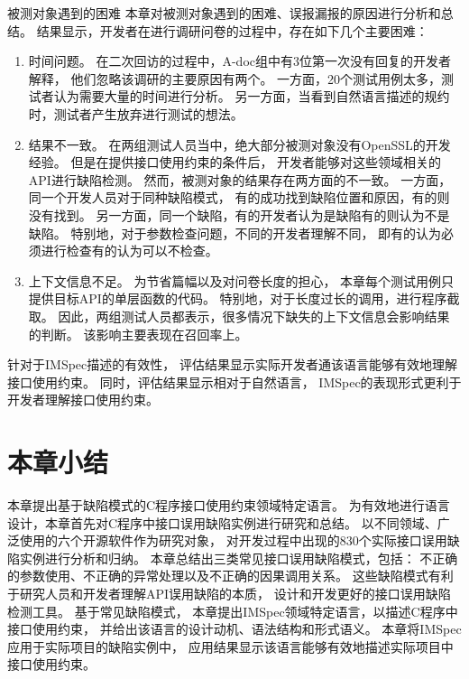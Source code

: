 {\kaishu 被测对象遇到的困难 }
本章对被测对象遇到的困难、误报漏报的原因进行分析和总结。
结果显示，开发者在进行调研问卷的过程中，存在如下几个主要困难：
\begin{enumerate}
	\item 时间问题。
	在二次回访的过程中，A-doc组中有3位第一次没有回复的开发者解释，
	他们忽略该调研的主要原因有两个。
	一方面，20个测试用例太多，测试者认为需要大量的时间进行分析。
	另一方面，当看到自然语言描述的规约时，测试者产生放弃进行测试的想法。
	\item 结果不一致。
	在两组测试人员当中，绝大部分被测对象没有OpenSSL的开发经验。
	但是在提供接口使用约束的条件后，
	开发者能够对这些领域相关的API进行缺陷检测。
	然而，被测对象的结果存在两方面的不一致。
	一方面，同一个开发人员对于同种缺陷模式，
	有的成功找到缺陷位置和原因，有的则没有找到。
	另一方面，同一个缺陷，有的开发者认为是缺陷有的则认为不是缺陷。
	特别地，对于参数检查问题，不同的开发者理解不同，
	即有的认为必须进行检查有的认为可以不检查。
	\item 上下文信息不足。
	为节省篇幅以及对问卷长度的担心，
	本章每个测试用例只提供目标API的单层函数的代码。
	特别地，对于长度过长的调用，进行程序截取。
	因此，两组测试人员都表示，很多情况下缺失的上下文信息会影响结果的判断。
	该影响主要表现在召回率上。
\end{enumerate}
	
针对于IMSpec描述的有效性，
评估结果显示实际开发者通该语言能够有效地理解接口使用约束。
同时，评估结果显示相对于自然语言，
IMSpec的表现形式更利于开发者理解接口使用约束。

\section{本章小结}
\label{sec:2.6}
本章提出基于缺陷模式的C程序接口使用约束领域特定语言。
为有效地进行语言设计，本章首先对C程序中接口误用缺陷实例进行研究和总结。
以不同领域、广泛使用的六个开源软件作为研究对象，
对开发过程中出现的830个实际接口误用缺陷实例进行分析和归纳。
本章总结出三类常见接口误用缺陷模式，包括：
不正确的参数使用、不正确的异常处理以及不正确的因果调用关系。
这些缺陷模式有利于研究人员和开发者理解API误用缺陷的本质，
设计和开发更好的接口误用缺陷检测工具。
基于常见缺陷模式，
本章提出IMSpec领域特定语言，以描述C程序中接口使用约束，
并给出该语言的设计动机、语法结构和形式语义。
本章将IMSpec应用于实际项目的缺陷实例中，
应用结果显示该语言能够有效地描述实际项目中接口使用约束。
